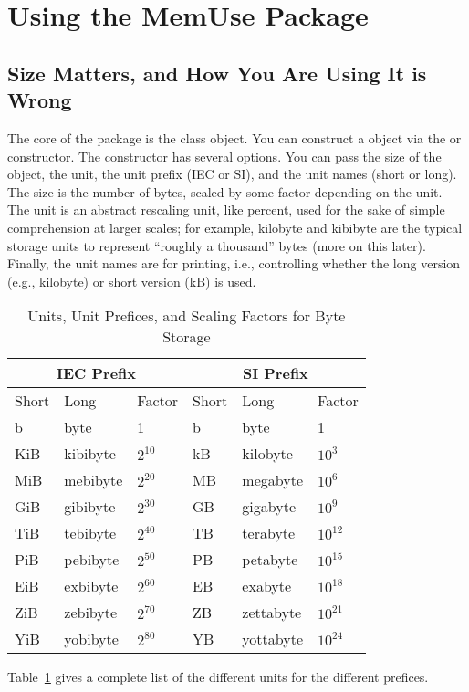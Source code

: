 


\section{Using the MemUse Package}

\subsection{Size Matters, and How You Are Using It is Wrong}
The core of the  package is the  class object.  You can construct a  object via the  or  constructor.  The constructor has several options.  You can pass the size of the object, the unit, the unit prefix (IEC or SI), and the unit names (short or long).  The size is the number of bytes, scaled by some factor depending on the unit.  The unit is an abstract rescaling unit, like percent, used for the sake of simple comprehension at larger scales; for example, kilobyte and kibibyte are the typical storage units to represent ``roughly a thousand'' bytes (more on this later).  Finally, the unit names are for printing, i.e., controlling whether the long version (e.g., kilobyte) or short version (kB) is used.
\begin{table}[ht]
  \centering
  \begin{tabular}{|lll|lll|}\hline
    \multicolumn{3}{|c}{IEC Prefix} & \multicolumn{3}{|c|}{SI Prefix} \\\hline
    Short & Long & Factor & Short & Long & Factor\\\hline
    b & byte & 1 & b & byte & 1\\
    KiB & kibibyte & $2^{10}$ & kB & kilobyte & $10^3$\\
    MiB & mebibyte & $2^{20}$ & MB & megabyte & $10^6$\\
    GiB & gibibyte & $2^{30}$ & GB & gigabyte & $10^9$\\
    TiB & tebibyte & $2^{40}$ & TB & terabyte & $10^{12}$\\
    PiB & pebibyte & $2^{50}$ & PB & petabyte & $10^{15}$\\
    EiB & exbibyte & $2^{60}$ & EB & exabyte & $10^{18}$\\
    ZiB & zebibyte & $2^{70}$ & ZB & zettabyte & $10^{21}$\\
    YiB & yobibyte & $2^{80}$ & YB & yottabyte & $10^{24}$\\\hline
  \end{tabular}
  \caption{Units, Unit Prefices, and Scaling Factors for Byte Storage}
  \label{tab:units}
\end{table}
Table~\ref{tab:units} gives a complete list of the different units for the different prefices.

